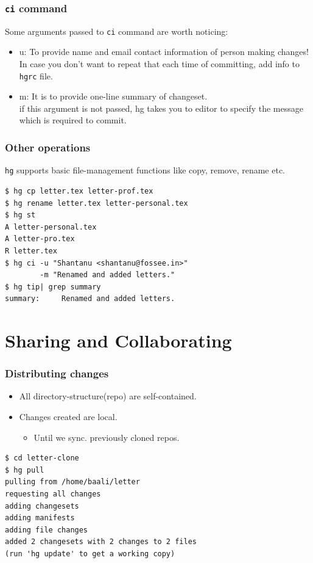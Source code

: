 \documentclass[14pt,compress]{beamer}
\newcounter{time}
\newcommand{\inctime}[1]{\addtocounter{time}{#1}{\tiny \thetime\ m}}
\newcommand{\typ}[1]{\lstinline{#1}}
\begin{document}
\begin{frame}[fragile]
  \frametitle{\typ{ci} command}
  Some arguments passed to \typ{ci} command are worth noticing:
  \begin{itemize}
  \item \alert{u}: To provide name and email contact information of person making changes!\\
  In case you don't want to repeat that each time of committing, add info to \typ{hgrc} file.
  \item<2-> \alert{m}: It is to provide one-line summary of changeset. \\
    if this argument is not passed, hg takes you to editor to specify the message which is required to commit.
  \end{itemize}  
\end{frame}

\begin{frame}[fragile]
  \frametitle{Other operations}
  \typ{hg} supports basic file-management functions like copy, remove, rename etc.
  \begin{lstlisting}
$ hg cp letter.tex letter-prof.tex
$ hg rename letter.tex letter-personal.tex
$ hg st
A letter-personal.tex
A letter-pro.tex
R letter.tex
$ hg ci -u "Shantanu <shantanu@fossee.in>" 
        -m "Renamed and added letters."
$ hg tip| grep summary 
summary:     Renamed and added letters.
  \end{lstlisting} %
  \inctime{10}
\end{frame}

\section{Sharing and Collaborating}

\begin{frame}[fragile]
  \frametitle{Distributing changes}
  \begin{itemize}
  \item All directory-structure(repo) are self-contained.
  \item Changes created are local.
    \begin{itemize}
    \item Until we sync. previously cloned repos.
    \end{itemize}
  \end{itemize}
  \begin{lstlisting}
$ cd letter-clone
$ hg pull 
pulling from /home/baali/letter
requesting all changes
adding changesets
adding manifests
adding file changes
added 2 changesets with 2 changes to 2 files
(run 'hg update' to get a working copy)
  \end{lstlisting} %
\end{frame}
\end{document}
